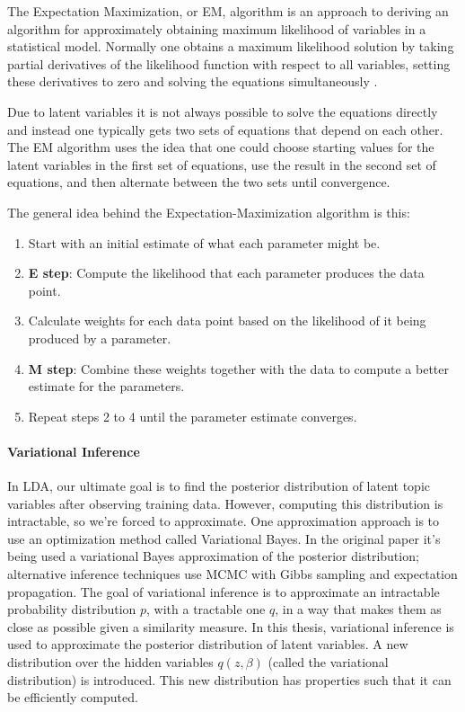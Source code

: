 \documentclass[12pt]{report}
\begin{document}
The Expectation Maximization, or EM, algorithm is an approach to deriving an
algorithm for approximately obtaining maximum likelihood of variables in a
statistical model. Normally one obtains a maximum likelihood solution by taking
partial derivatives of the likelihood function with respect to all variables,
setting these derivatives to zero and solving the equations simultaneously
\cite{Myung:2003}.

Due to latent variables it is not always possible to solve the equations
directly and instead one typically gets two sets of equations that depend on
each other. The EM algorithm uses the idea that one could choose starting
values for the latent variables in the first set of equations, use the result
in the second set of equations, and then alternate between the two sets until
convergence.

The general idea behind the Expectation-Maximization algorithm is this:

\begin{enumerate}
\item Start with an initial estimate of what each parameter might be.
\item \textbf{E step}: Compute the likelihood that each parameter produces 
the data point.
\item Calculate weights for each data point based on the likelihood of it 
being produced by a parameter.
\item \textbf{M step}: Combine these weights together with the data to 
compute a better estimate for the parameters.
\item Repeat steps 2 to 4 until the parameter estimate converges.
\end{enumerate}

\paragraph{Variational Inference}

In LDA, our ultimate goal is to find the posterior distribution of
latent topic variables after observing training data. However,
computing this distribution is intractable, so we're forced to
approximate. One approximation approach is to use an optimization
method called Variational Bayes. In the original paper it's being used
a variational Bayes approximation of the posterior distribution;
\cite{blei2003latent} alternative inference techniques use 
MCMC with Gibbs sampling\cite{Griffiths02gibbssampling} and expectation 
propagation\cite{Minka:2002:EGA:2073876.2073918}. The goal of variational
inference is to approximate an intractable probability distribution
$p$, with a tractable one $q$, in a way that makes them as close as
possible given a similarity measure. In this thesis, variational
inference is used to approximate the posterior distribution of latent
variables. A new distribution over the hidden variables $q(z, \beta)$
(called the variational distribution) is introduced. This new
distribution has properties such that it can be efficiently
computed\cite{Fox2011ATO}.
\end{document}
